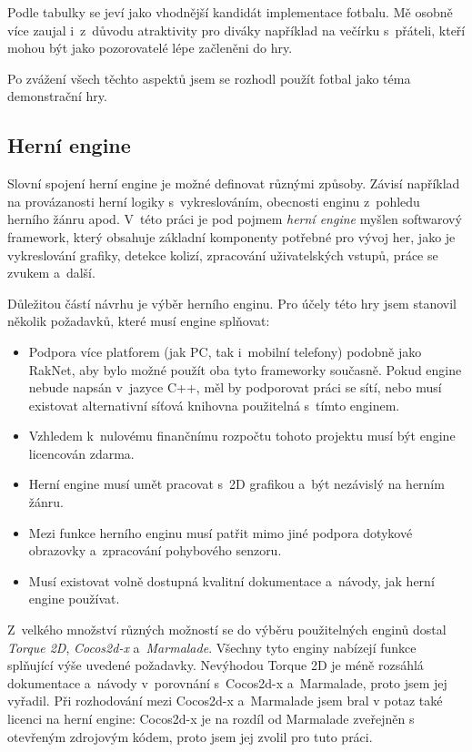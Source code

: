 \documentclass[thesis=B,czech,hidelinks]{FITthesis}[2012/06/26] %
\begin{document}
Podle tabulky se jeví jako vhodnější kandidát implementace fotbalu. Mě osobně více zaujal i~z~důvodu atraktivity pro diváky například na večírku s~přáteli, kteří mohou být jako pozorovatelé lépe začleněni do hry. 

Po zvážení všech těchto aspektů jsem se rozhodl použít fotbal jako téma demonstrační hry.

\subsection{Herní engine}

Slovní spojení herní engine je možné definovat různými způsoby. Závisí například na provázanosti herní logiky s~vykreslováním, obecnosti enginu z~pohledu herního žánru apod. V~této práci je pod pojmem \textit{herní engine} myšlen softwarový framework, který obsahuje základní komponenty potřebné pro vývoj her, jako je vykreslování grafiky, detekce kolizí, zpracování uživatelských vstupů, práce se zvukem a~další. \cite{gameengine}

Důležitou částí návrhu je výběr herního enginu. Pro účely této hry jsem stanovil několik požadavků, které musí engine splňovat:

\begin{itemize}
	\item Podpora více platforem (jak PC, tak i~mobilní telefony) podobně jako RakNet, aby bylo možné použít oba tyto frameworky současně. Pokud engine nebude napsán v~jazyce C++, měl by podporovat práci se sítí, nebo musí existovat alternativní síťová knihovna použitelná s~tímto enginem.
	\item Vzhledem k~nulovému finančnímu rozpočtu tohoto projektu musí být engine licencován zdarma.
	\item Herní engine musí umět pracovat s~2D grafikou a~být nezávislý na herním žánru.
	\item Mezi funkce herního enginu musí patřit mimo jiné podpora dotykové obrazovky a~zpracování pohybového senzoru.
	\item Musí existovat volně dostupná kvalitní dokumentace a~návody, jak herní engine používat.
\end{itemize}

Z~velkého množství různých možností se do výběru použitelných enginů dostal \textit{Torque 2D}, \textit{Cocos2d-x} a~\textit{Marmalade}. Všechny tyto enginy nabízejí funkce splňující výše uvedené požadavky. Nevýhodou Torque 2D je méně rozsáhlá dokumentace a~návody v~porovnání s~Cocos2d-x a~Marmalade, proto jsem jej vyřadil. Při rozhodování mezi Cocos2d-x a~Marmalade jsem bral v potaz také licenci na herní engine: Cocos2d-x je na rozdíl od Marmalade zveřejněn s otevřeným zdrojovým kódem, proto jsem jej zvolil pro tuto práci.
\end{document}
